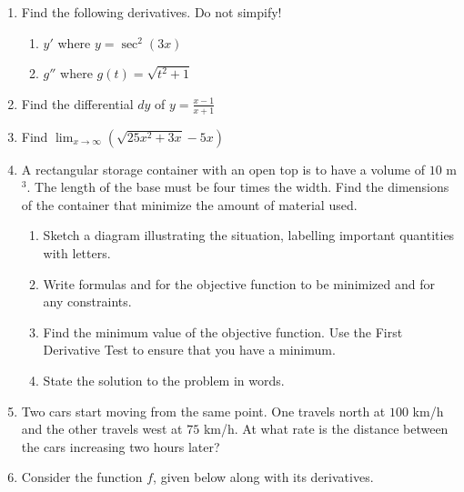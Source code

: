 \documentclass[12pt]{article}
\newcommand{\ds}{\displaystyle}
\begin{document}
\begin{enumerate}
\item Find the following derivatives.  Do not simpify!
  \begin{enumerate}
  \item $\ds y'$
    where 
    $\ds y = \sec^2 (3x)$
\vfill
  \item $\ds g''$
    where 
    $\ds g(t)=\sqrt{t^2+1}$
\vfill
  \end{enumerate}
\newpage
\item Find
  the differential $dy$ of 
  $\ds y=\frac{x-1}{x+1}$
\vfill
\item Find 
  $\ds \lim_{x\to \infty} \left(\sqrt{25x^2+3x}-5x\right)$
\vfill
\newpage
\item A rectangular storage container with an open
  top is to have a volume of $10$ m$^3$.  The length of the base must be
  four times
  the width.  Find the dimensions of the container that minimize the
  amount of material used.
  \begin{enumerate}
  \item Sketch a diagram illustrating the situation, labelling important
    quantities with letters.
\vfill
\vfill
  \item Write formulas and for the objective function
    to be minimized and for any constraints.
\vfill
\vfill
  \item Find the minimum value of the objective function.  Use the First
    Derivative Test to ensure that you have a minimum.
\vfill
\vfill
  \item State the solution to the problem in words.
\vfill
  \end{enumerate}
\newpage
\item Two 
  cars start moving from the same point.  One travels 
  north at $100$ km/h
  and the other travels 
  west at $75$ km/h.
  At what rate is the distance
  between the cars increasing two hours later?
\vfill
\newpage
\item Consider
  the function $f$, given below along with its derivatives.

\end{enumerate}
\end{document}
